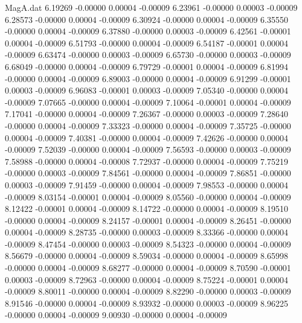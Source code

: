 \begin{filecontents}{MagA.dat}
   6.19269   -0.00000    0.00004   -0.00009
   6.23961   -0.00000    0.00003   -0.00009
   6.28573   -0.00000    0.00004   -0.00009
   6.30924   -0.00000    0.00004   -0.00009
   6.35550   -0.00000    0.00004   -0.00009
   6.37880   -0.00000    0.00003   -0.00009
   6.42561   -0.00001    0.00004   -0.00009
   6.51793   -0.00000    0.00004   -0.00009
   6.54187   -0.00001    0.00004   -0.00009
   6.63474   -0.00000    0.00003   -0.00009
   6.65730   -0.00000    0.00003   -0.00009
   6.68049   -0.00000    0.00004   -0.00009
   6.79729   -0.00001    0.00004   -0.00009
   6.81994   -0.00000    0.00004   -0.00009
   6.89003   -0.00000    0.00004   -0.00009
   6.91299   -0.00001    0.00003   -0.00009
   6.96083   -0.00001    0.00003   -0.00009
   7.05340   -0.00000    0.00004   -0.00009
   7.07665   -0.00000    0.00004   -0.00009
   7.10064   -0.00001    0.00004   -0.00009
   7.17041   -0.00000    0.00004   -0.00009
   7.26367   -0.00000    0.00003   -0.00009
   7.28640   -0.00000    0.00004   -0.00009
   7.33323   -0.00000    0.00004   -0.00009
   7.35725   -0.00000    0.00004   -0.00009
   7.40381   -0.00000    0.00004   -0.00009
   7.42626   -0.00000    0.00004   -0.00009
   7.52039   -0.00000    0.00004   -0.00009
   7.56593   -0.00000    0.00003   -0.00009
   7.58988   -0.00000    0.00004   -0.00008
   7.72937   -0.00000    0.00004   -0.00009
   7.75219   -0.00000    0.00003   -0.00009
   7.84561   -0.00000    0.00004   -0.00009
   7.86851   -0.00000    0.00003   -0.00009
   7.91459   -0.00000    0.00004   -0.00009
   7.98553   -0.00000    0.00004   -0.00009
   8.03154   -0.00001    0.00004   -0.00009
   8.05560   -0.00000    0.00004   -0.00009
   8.12422   -0.00001    0.00004   -0.00009
   8.14722   -0.00000    0.00004   -0.00009
   8.19510   -0.00000    0.00004   -0.00009
   8.24157   -0.00001    0.00004   -0.00009
   8.26451   -0.00000    0.00004   -0.00009
   8.28735   -0.00000    0.00003   -0.00009
   8.33366   -0.00000    0.00004   -0.00009
   8.47454   -0.00000    0.00003   -0.00009
   8.54323   -0.00000    0.00004   -0.00009
   8.56679   -0.00000    0.00004   -0.00009
   8.59034   -0.00000    0.00004   -0.00009
   8.65998   -0.00000    0.00004   -0.00009
   8.68277   -0.00000    0.00004   -0.00009
   8.70590   -0.00001    0.00003   -0.00009
   8.72963   -0.00000    0.00004   -0.00009
   8.75224   -0.00001    0.00004   -0.00009
   8.80011   -0.00000    0.00004   -0.00009
   8.82290   -0.00000    0.00003   -0.00009
   8.91546   -0.00000    0.00004   -0.00009
   8.93932   -0.00000    0.00003   -0.00009
   8.96225   -0.00000    0.00004   -0.00009
   9.00930   -0.00000    0.00004   -0.00009

\end{filecontents}
